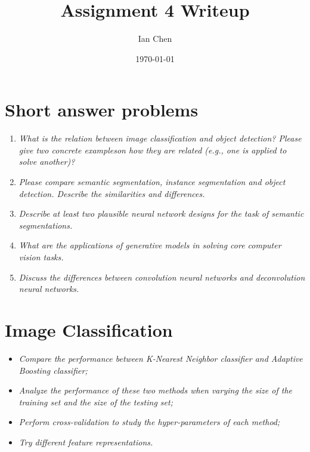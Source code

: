 \documentclass[11pt]{article}
\title{Assignment 4 Writeup}
\author{Ian Chen}
\date{\today}
\begin{document}
    \maketitle


    \section{Short answer problems}

    \begin{enumerate}
        \item \textit{What is the relation between image classification and object detection?
        Please give two concrete exampleson how they are related (e.g., one is applied to solve another)?}

        \item \textit{Please compare semantic segmentation, instance segmentation and object detection.
        Describe the similarities and differences.}

        \item \textit{Describe at least two plausible neural network designs for the task of semantic segmentations.}

        \item \textit{What are the applications of generative models in solving core computer vision tasks.}

        \item \textit{Discuss the differences between convolution neural networks and deconvolution neural networks.}
    \end{enumerate}


    \section{Image Classification}

    \begin{itemize}
        \item \textit{Compare the performance between K-Nearest Neighbor classifier and Adaptive Boosting classifier;}

        \item \textit{Analyze the performance of these two methods when varying the size of the training set
        and the size of the testing set;}

        \item \textit{Perform cross-validation to study the hyper-parameters of each method;}

        \item \textit{Try different feature representations.}
    \end{itemize}
\end{document}
